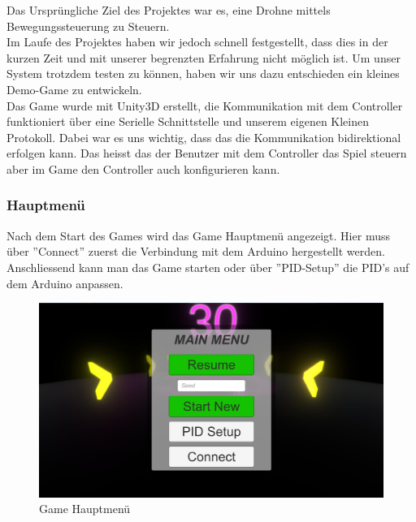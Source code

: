 Das Ursprüngliche Ziel des Projektes war es, eine Drohne mittels Bewegungssteuerung zu Steuern.\\
Im Laufe des Projektes haben wir jedoch schnell festgestellt, dass dies in der kurzen Zeit und mit unserer begrenzten Erfahrung nicht möglich ist.
Um unser System trotzdem testen zu können, haben wir uns dazu entschieden ein kleines Demo-Game zu entwickeln.\\
Das Game wurde mit Unity3D erstellt, die Kommunikation mit dem Controller funktioniert über eine Serielle Schnittstelle und unserem eigenen Kleinen Protokoll.
Dabei war es uns wichtig, dass das die Kommunikation bidirektional erfolgen kann. Das heisst das der Benutzer mit dem Controller das Spiel steuern aber im Game den
Controller auch konfigurieren kann.\\

\subsubsection{Hauptmenü}
Nach dem Start des Games wird das Game Hauptmenü angezeigt. Hier muss über ''Connect'' zuerst die Verbindung mit dem Arduino hergestellt werden. Anschliessend kann man das Game starten oder über ''PID-Setup'' die PID's auf dem Arduino anpassen.

\begin{figure}[H]
  \begin{center}
    \includegraphics[width=0.55\linewidth]{content/images/menu1.jpg}
    \caption{Game Hauptmenü}
  \end{center}
\end{figure}

\newpage
